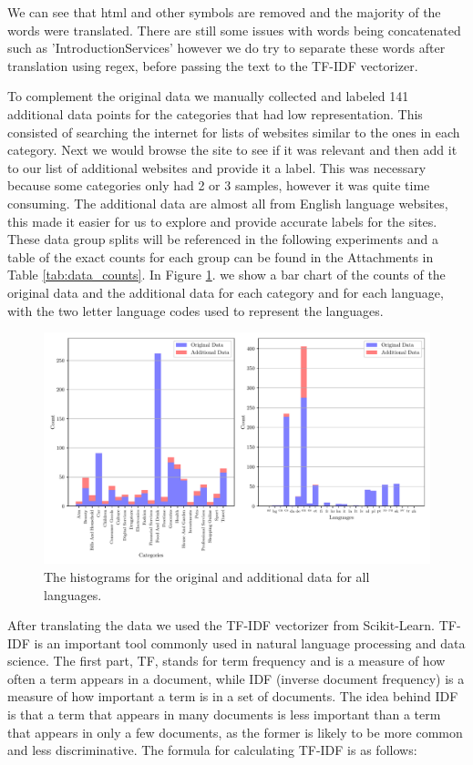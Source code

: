 We can see that html and other symbols are removed and the majority of the words were translated. There are still some issues with words being concatenated such as 'IntroductionServices' however we do try to separate these words after translation using regex, before passing the text to the TF-IDF vectorizer.

To complement the original data we manually collected and labeled 141 additional data points for the categories that had low representation. This consisted of searching the internet for lists of websites similar to the ones in each category. Next we would browse the site to see if it was relevant and then add it to our list of additional websites and provide it a label. This was necessary because some categories only had 2 or 3 samples, however it was quite time consuming. The additional data are almost all from English language websites, this made it easier for us to explore and provide accurate labels for the sites. These data group splits will be referenced in the following experiments and a table of the exact counts for each group can be found in the Attachments in Table \ref{tab:data_counts}. In Figure \ref{fig:all_hist}. we show a bar chart of the counts of the original data and the additional data for each category and for each language, with the two letter language codes used to represent the languages.

\begin{figure}[!ht]
  \centering
  \includegraphics[width=\textwidth]{../img/plot_all_hist}
  \caption{The histograms for the original and additional data for all languages.}
  \label{fig:all_hist}
\end{figure}

After translating the data we used the TF-IDF vectorizer from Scikit-Learn. TF-IDF is an important tool commonly used in natural language processing and data science. The first part, TF, stands for term frequency and is a measure of how often a term appears in a document, while IDF (inverse document frequency) is a measure of how important a term is in a set of documents. The idea behind IDF is that a term that appears in many documents is less important than a term that appears in only a few documents, as the former is likely to be more common and less discriminative. The formula for calculating TF-IDF is as follows:

